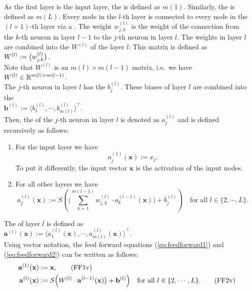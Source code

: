 As the first layer is the input layer, the  is defined as
$m(1)$.  Similarly, the  is defined as $m(L)$.
Every node in the $l$-th layer is connected to every node in the $(l+1)$-th layer via a .
The weight $w_{j,k}^{(l)}$ is the weight of the connection from the $k$-th neuron in layer $l-1$ to
the $j$-th neuron in layer $l$.  The weights in layer $l$ are combined into the  $W^{(l)}$ of
the layer $l$: This matrix is defined as
\\[0.2cm]
\hspace*{1.3cm}
$\displaystyle W^{(l)} := \bigl( w_{j,k}^{(l)} \bigr)$.
\\[0.2cm]
Note that $W^{(l)}$ is an $m(l) \times m(l-1)$ matrix, i.e.~we have
\\[0.2cm]
\hspace*{1.3cm}
$\displaystyle W^{(l)} \in \mathbb{R}^{m(l) \times m(l-1)}$.
\\[0.2cm]
The $j$-th neuron in layer $l$ has the  $b_j^{(l)}$.  These biases of layer $l$ are combined into
the 
\\[0.2cm]
\hspace*{1.3cm}
$\mathbf{b}^{(l)} := \langle b_1^{(l)}, \cdots, b_{m(l)}^{(l)} \rangle^\top$.
\\[0.2cm]
Then, the  of the $j$-th neuron
in layer $l$ is denoted as $a_j^{(l)}$ and is defined recursively as follows:
\begin{enumerate}
\item For the input layer we have
      \begin{equation}
        \label{eq:feedforward1}
       a^{(1)}_j(\mathbf{x}) := x_j.
       \tag{FF1}
      \end{equation}
      To put it differently, the input vector $\mathbf{x}$ is the activation of the input nodes.
\item For all other layers we have
      \begin{equation}
         \label{eq:feedforward2}
         a_j^{(l)}(\mathbf{x}) := 
             S\left(\Biggl(\sum\limits_{k=1}^{m(l-1)} w_{j,k}^{(l)}\cdot a_k^{(l-1)}(\mathbf{x})\Biggr) + b_{j}^{(l)}\right) 
        \quad \mbox{for all $l \in \{2, \cdots, L\}$}.
       \tag{FF2}
\end{equation}
\end{enumerate}
The  of layer $l$ is defined as
\\[0.2cm]
\hspace*{1.3cm}
$\mathbf{a}^{(l)}(\mathbf{x}) := \langle a_1^{(l)}(\mathbf{x}), \cdots, a_{m(l)}^{(l)}(\mathbf{x}) \rangle^\top$.
\\[0.2cm]
Using vector notation, the feed forward equations (\ref{eq:feedforward1}) and (\ref{eq:feedforward2}) can be
written as follows:
\begin{align}
  \label{eq:feedforward1v}
  \mathbf{a}^{(1)}(\mathbf{x}) & := \mathbf{x},
  \tag{FF1v} \\ 
  \label{eq:feedforward2v}
  \mathbf{a}^{(l)}(\mathbf{x}) & := 
  S\Bigl( W^{(l)} \cdot \mathbf{a}^{(l-1)}(\mathbf{x})\bigr) + \mathbf{b}^{(l)}\Bigr)
  \quad \mbox{for all $l \in \{2, \cdots, L\}$}.
  \tag{FF2v}
\end{align}

